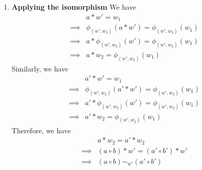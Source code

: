 \begin{proofE}
\begin{enumerate}
    \item \textbf{Applying the isomorphism}
    We have
    \begin{align}
        & a \ast w' = w_{1} \\
        \implies & \phi_{(w', w_{2})}(a \ast w') = \phi_{(w', w_{2})}(w_{1}) \\
        \implies & a \ast \phi_{(w', w_{2})}(w') = \phi_{(w', w_{2})}(w_{1}) \\
        \implies & a \ast w_{2} = \phi_{(w', w_{2})}(w_{1})
    \end{align}
    Similarly, we have
    \begin{align}
        & a' \ast w' = w_{1} \\
        \implies & \phi_{(w', w_{2})}(a' \ast w') = \phi_{(w', w_{2})}(w_{1}) \\
        \implies & a' \ast \phi_{(w', w_{2})}(w') = \phi_{(w', w_{2})}(w_{1}) \\
        \implies & a' \ast w_{2} = \phi_{(w', w_{2})}(w_{1})
    \end{align}
    Therefore, we have
    \begin{align}
        & a \ast w_{2} = a' \ast w_{2} \\
        \implies & (a \circ b) \ast w' = (a' \circ b') \ast w' \\
        \implies & (a \circ b) \sim_{w'} (a' \circ b')
    \end{align}
\end{enumerate}
\end{proofE}


